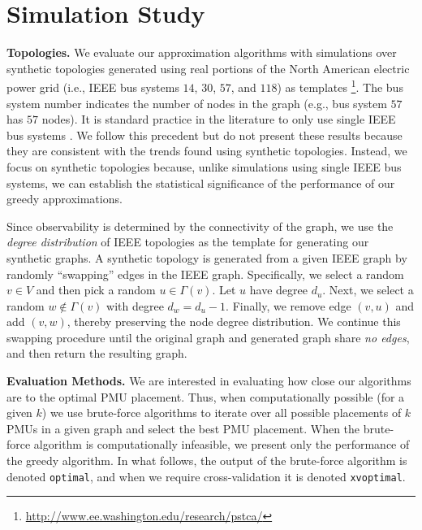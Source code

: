 \section{Simulation Study}
\label{sec:simulations}

\textbf{Topologies.} 
We evaluate our approximation algorithms with simulations over synthetic topologies generated using real portions of the North American electric power grid 
(i.e., IEEE bus systems $14$, $30$, $57$, and $118$) as templates \footnote{\url{http://www.ee.washington.edu/research/pstca/}}. 
The bus system number indicates the number of nodes in the graph (e.g., bus system $57$ has $57$ nodes).
It is standard practice in the literature to only use single IEEE bus systems \cite{Baldwin93,Abur06,Mili90,Xu04}.  
We follow this precedent but do not present these results because they are consistent with the trends found using synthetic topologies.
Instead, we focus on synthetic topologies because, unlike simulations using single IEEE bus systems, we can establish the statistical significance of the performance of our greedy approximations.

Since observability is determined by the connectivity of the graph, we use the {\em degree distribution} of IEEE topologies as the template for generating our synthetic graphs.
A synthetic topology is generated from a given IEEE graph by randomly ``swapping'' edges in the IEEE graph. Specifically, we select a random $v \in V$ and then pick a random $u \in \Gamma(v)$. 
Let $u$ have degree $d_u$.  Next, we select a random $w \notin \Gamma(v)$ with degree $d_w = d_u -1$. %
Finally, we remove edge $(v,u)$ and add $(v,w)$, thereby preserving the node degree distribution.
We continue this swapping procedure until the original graph and generated graph share {\em no edges}, and then return the resulting graph.

\textbf{Evaluation Methods.}
We are interested in evaluating how close our algorithms are to the optimal PMU placement. 
Thus, when computationally possible (for a given $k$) we use brute-force algorithms to iterate over all possible placements of $k$ PMUs in a given graph and select the best PMU placement. 
When the brute-force algorithm is computationally infeasible, we present only the performance of the greedy algorithm.
In what follows, the output of the brute-force algorithm is denoted {\tt optimal}, and when we require cross-validation it is denoted {\tt xvoptimal}.


